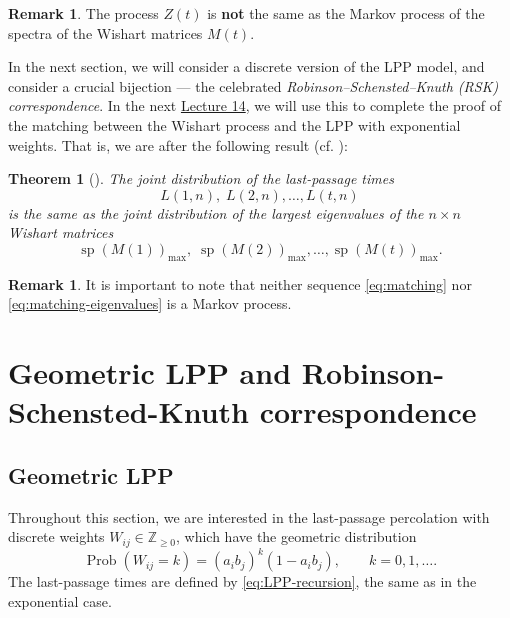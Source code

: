 \documentclass[letterpaper,11pt,oneside,reqno]{article}
\numberwithin{equation}{section}
\newtheorem{theorem}[proposition]{Theorem}
\theoremstyle{definition}
\newtheorem{remark}[proposition]{Remark}
\begin{document}
\begin{remark}
	\label{rem:Z_not_Markov}
	The process $Z(t)$ is \textbf{not} the same as the
	Markov process of the spectra of the Wishart matrices
	$M(t)$.
\end{remark}

In the next section, we will consider a discrete version of the
LPP model, and consider a crucial bijection --- the celebrated
\emph{Robinson--Schensted--Knuth (RSK) correspondence}.
In the next \href{https://lpetrov.cc/rmt25/rmt25-notes/rmt2025-l14.pdf}{Lecture 14}, we will
use this to complete the proof of the matching between the
Wishart process and the LPP with exponential weights.
That is, we are after the following result (cf. ):
\begin{theorem}[\cite{dieker2008largest}]
	\label{thm:matching}
	The joint distribution of the last-passage times
	\begin{equation}
		\label{eq:matching}
		L(1,n),\;L(2,n),\ldots,L(t,n)
	\end{equation}
	is the same as the joint distribution of the largest
	eigenvalues
	of the $n\times n$ Wishart matrices
	\begin{equation}
		\label{eq:matching-eigenvalues}
		\operatorname{sp}(M(1))_{\max},\;\operatorname{sp}(M(2))_{\max},\ldots,\operatorname{sp}(M(t))_{\max}.
	\end{equation}
\end{theorem}

\begin{remark}
    It is important to note
		that
		neither sequence
		\eqref{eq:matching} nor \eqref{eq:matching-eigenvalues}
		is a Markov process.
\end{remark}


\section{Geometric LPP and Robinson-Schensted-Knuth correspondence}

\subsection{Geometric LPP}

Throughout this section, we are interested in the
last-passage percolation with discrete weights $W_{ij}\in \mathbb{Z}_{\ge0}$,
which have the geometric distribution
\begin{equation}
	\label{eq:geometric}
	\operatorname{Prob}(W_{ij}=k) = (a_i b_j)^{k}(1 - a_ib_j),
    \qquad k=0,1,\ldots.
\end{equation}
The last-passage times are defined by \eqref{eq:LPP-recursion},
the same as in the exponential case.
\end{document}
